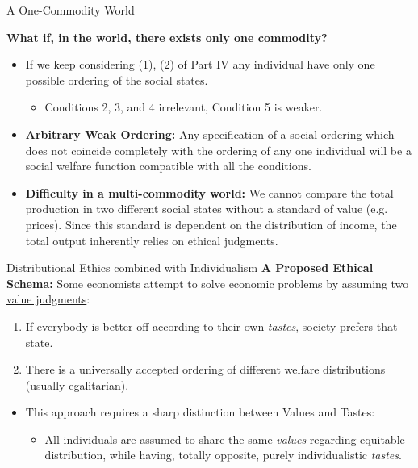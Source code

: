 \documentclass{beamer}
\begin{document}
\begin{frame}{A One-Commodity World}

\textbf{What if, in the world, there exists only one commodity?}

    \begin{itemize}
        \item If we keep considering (1), (2) of Part IV any individual have only one possible ordering of the social states.
        \begin{itemize}
            \item[$\Rightarrow$] Conditions 2, 3, and 4 irrelevant, Condition 5 is weaker.
        \end{itemize}
        \item \textbf{Arbitrary Weak Ordering:} Any specification of a social ordering which does not coincide completely with the ordering of any one individual will be a social welfare function compatible with all the conditions.
        \item \textbf{Difficulty in a multi-commodity world:} We cannot compare the total production in two different social states without a standard of value (e.g. prices). Since this standard is dependent on the distribution of income, the total output inherently relies on ethical judgments.
    \end{itemize}
\end{frame}

\begin{frame}{Distributional Ethics combined with Individualism}
    \textbf{A Proposed Ethical Schema:} Some economists attempt to solve economic problems by assuming two \uline{value judgments}:
    \begin{enumerate}
        \item If everybody is better off according to their own \textit{tastes}, society prefers that state.
        \item There is a universally accepted ordering of different welfare distributions (usually egalitarian).
    \end{enumerate}
    \vspace{0.25 cm}
    \begin{itemize}
        \item This approach requires a sharp distinction between Values and Tastes: 
        \begin{itemize}
            \vspace{-0.25 cm}
            \item[$\Rightarrow$] All individuals are assumed to share the same \textit{values} regarding equitable distribution, while having, totally opposite, purely individualistic \textit{tastes}.
        \end{itemize}
    \end{itemize}
\end{frame}
\end{document}
